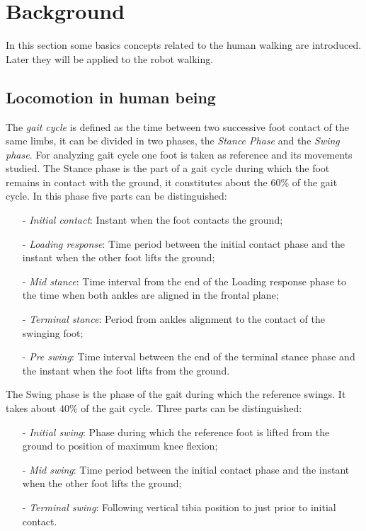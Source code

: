 \section{Background}
In this section some basics concepts related to the human walking are introduced. Later they will
be applied to the robot walking.
\subsection{Locomotion in human being}
The \emph{gait cycle} is defined as the time between two successive foot contact of the same limbs,
it can be divided in two phases, the \emph{Stance Phase}  and the \emph{Swing phase}.
For analyzing gait cycle one foot is taken as reference and its movements studied.
The Stance phase is the part of a gait cycle during which the foot remains in contact with the
ground, it constitutes about the $60\%$ of the gait cycle. In this phase five parts can be
distinguished:
\begin{itemize}
\item [-]\emph{Initial contact}: Instant when the foot contacts the ground;
\item [-]\emph{Loading response}: Time period between the initial contact phase and the instant
  when the other foot lifts the ground;
\item [-]\emph{Mid stance}: Time interval from the end of the Loading response phase to the time
  when both ankles are aligned in the frontal plane;
\item[-]\emph{Terminal stance}: Period from ankles alignment to the contact of the swinging foot;
\item[-]\emph{Pre swing}: Time interval between the end of the terminal stance phase and the instant
  when the foot lifts from the ground.
\end{itemize}
The Swing phase is the phase of the gait during which the reference swings. It takes about $40\%$ of the gait cycle. Three parts can be distinguished:
\begin{itemize}
\item [-]\emph{Initial swing}: Phase during which the reference foot is lifted from the ground
  to position of maximum  knee flexion;
\item [-]\emph{Mid swing}: Time period between the initial contact phase and the instant when the other foot lifts the ground;
\item[-]\emph{Terminal swing}: Following vertical tibia position to just prior to initial contact.
\end{itemize}
